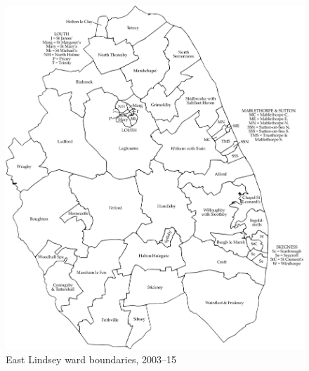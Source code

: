 \begin{figure}
\includegraphics[width=0.99\columnwidth]{source/e-lindsey03}
\caption{East Lindsey ward boundaries, 2003--15}
\end{figure}

